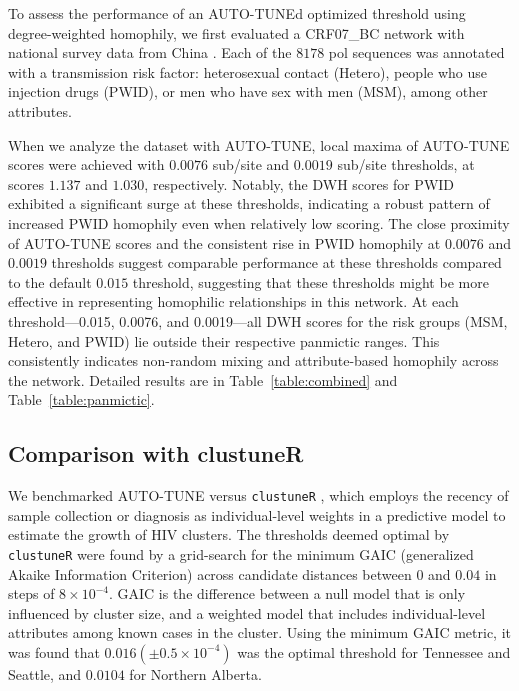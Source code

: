 \documentclass[utf8]{FrontiersinHarvard} %
\newcommand{\TODO}[1]{{\color{red}{#1}}}
\begin{document}
To assess the performance of an AUTO-TUNEd optimized threshold using
degree-weighted homophily, we first evaluated a CRF07\_BC network with national
survey data from China \cite{Ge:2021aa} . Each of the $8178$ pol sequences was
annotated with a transmission risk factor: heterosexual contact (Hetero),
people who use injection drugs (PWID), or men who have sex with men (MSM),
among other attributes.

When we analyze the dataset with AUTO-TUNE, local maxima of AUTO-TUNE scores
were achieved with $0.0076$ sub/site and $0.0019$ sub/site thresholds, at scores $1.137$ and $1.030$,
respectively. Notably, the DWH scores for PWID exhibited a significant surge at
these thresholds, indicating a robust pattern of increased PWID homophily even
when relatively low scoring. The close proximity of AUTO-TUNE scores and the
consistent rise in PWID homophily at $0.0076$ and $0.0019$ thresholds suggest
comparable performance at these thresholds compared to the default $0.015$
threshold, suggesting that these thresholds might be more effective in
representing homophilic relationships in this network. At each threshold—0.015,
0.0076, and 0.0019—all DWH scores for the risk groups (MSM, Hetero, and PWID)
lie outside their respective panmictic ranges. This consistently indicates
non-random mixing and attribute-based homophily across the network. Detailed
results are in Table~\ref{table:combined} and Table~\ref{table:panmictic}.

\TODO{VDC: it also makes sense epidemiologically that PWID (usually outbreaks) have lower scores (than 1.5\%) due to faster transmission or case identification, while aligning with the homophlilic pattern.}
\TODO{SW: VDC, do you have a reference for this?.}

\subsection{Comparison with clustuneR}

We benchmarked AUTO-TUNE versus {\tt clustuneR} \cite{chato_public_2020}, which
employs the recency of sample collection or diagnosis as individual-level
weights in a predictive model to estimate the growth of HIV clusters. The
thresholds deemed optimal by {\tt clustuneR} were found by a grid-search for
the minimum GAIC (generalized Akaike Information Criterion) across candidate
distances between $0$ and $0.04$ in steps of $8 \times 10^{-4}$. GAIC is the
difference between a null model that is only influenced by cluster size, and a
weighted model that includes individual-level attributes among known cases in
the cluster. Using the minimum GAIC metric, it was found that $0.016 (\pm
	0.5\times 10^{-4})$ was the optimal threshold for Tennessee and Seattle, and
$0.0104$ for Northern Alberta.
\end{document}
